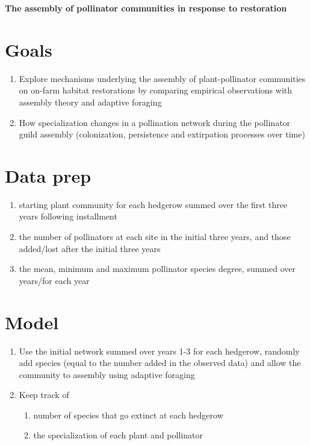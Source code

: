 \documentclass[12pt]{article}
\begin{document}
\begin{centering}
  \large {\bf The assembly of pollinator communities in response to
    restoration} \\
\end{centering}
\vspace{0.15in}


\section{Goals}
\begin{enumerate}
\item Explore mechanisms underlying the assembly of plant-pollinator
  communities on on-farm habitat restorations by comparing empirical
  observations with assembly theory and adaptive foraging
\item How specialization changes in a pollination network during the
  pollinator guild assembly (colonization, persistence and extirpation
  processes over time)
\end{enumerate}


\section{Data prep}
\begin{enumerate}
\item starting plant community for each hedgerow summed over the first
  three years following installment
\item the number of pollinators at each site in the initial three
  years, and those added/lost after the initial three years
\item the mean, minimum and maximum pollinator species degree, summed
  over years/for each year
\end{enumerate}

\section{Model}
\begin{enumerate}
\item Use the initial network summed over years 1-3 for each hedgerow,
  randomly add species (equal to the number added in the observed
  data) and allow the community to assembly using adaptive foraging
\item  Keep track of
  \begin{enumerate}
  \item number of species that go extinct at each hedgerow
  \item the specialization of each plant and pollinator
  \end{enumerate}
\end{enumerate}
\end{document}
